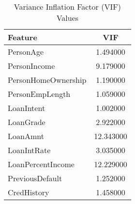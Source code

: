 \begin{table}[H]\centering
\caption{Variance Inflation Factor (VIF) Values}
\label{Table 4:vif_values}
\begin{tabular}{lc}
\toprule
Feature & VIF \\
\midrule
PersonAge & 1.494000 \\
PersonIncome & 9.179000 \\
PersonHomeOwnership & 1.190000 \\
PersonEmpLength & 1.059000 \\
LoanIntent & 1.002000 \\
LoanGrade & 2.922000 \\
LoanAmnt & 12.343000 \\
LoanIntRate & 3.035000 \\
LoanPercentIncome & 12.229000 \\
PreviousDefault & 1.252000 \\
CredHistory & 1.458000 \\
\bottomrule
\end{tabular}
\end{table}
